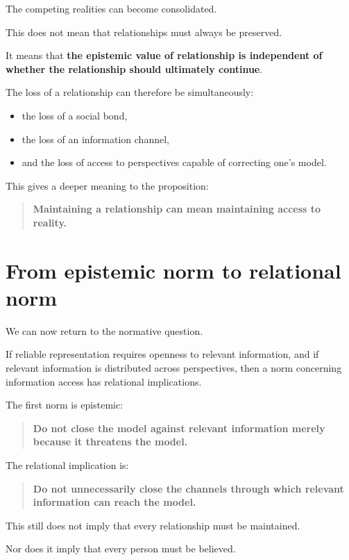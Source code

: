 \documentclass{article}
\begin{document}
The competing realities can become consolidated.

This does not mean that relationships must always be preserved.

It means that \textbf{the epistemic value of relationship is independent of whether the relationship should ultimately continue}.

The loss of a relationship can therefore be simultaneously:
\begin{itemize}
    \item the loss of a social bond,
    \item the loss of an information channel,
    \item and the loss of access to perspectives capable of correcting one's model.
\end{itemize}

This gives a deeper meaning to the proposition:

\begin{quote}
    \textbf{Maintaining a relationship can mean maintaining access to reality.}
\end{quote}

\section*{From epistemic norm to relational norm}

We can now return to the normative question.

If reliable representation requires openness to relevant information, and if relevant information is distributed across perspectives, then a norm concerning information access has relational implications.

The first norm is epistemic:

\begin{quote}
    \textbf{Do not close the model against relevant information merely because it threatens the model.}
\end{quote}

The relational implication is:

\begin{quote}
    \textbf{Do not unnecessarily close the channels through which relevant information can reach the model.}
\end{quote}

This still does not imply that every relationship must be maintained.

Nor does it imply that every person must be believed.
\end{document}
